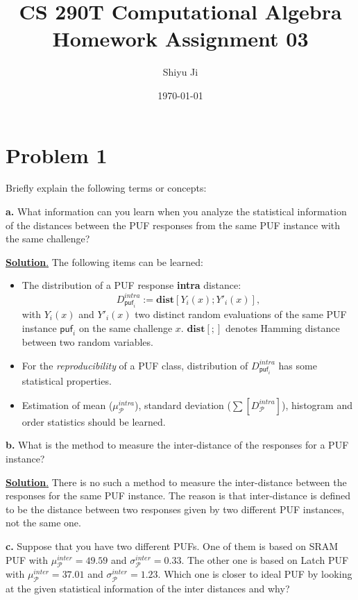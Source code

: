 \documentclass[12pt]{article}
\theoremstyle{plain}
\begin{document}
\title{CS 290T Computational Algebra Homework Assignment 03}
\author{Shiyu Ji}
\date{\today}
\maketitle

\newcommand{\m}[1]{\begin{bmatrix}#1\end{bmatrix}}
\newcommand{\rank}[1]{\operatorname{rank}(#1)}
\newcommand{\F}{\mathbb{F}}
\newcommand{\Sol}{\underline{\textbf{Solution}.} }

\section{Problem 1}
Briefly explain the following terms or concepts:

{\bf a.} What information can you learn when you analyze the statistical
information of the distances between the PUF responses from the
same PUF instance with the same challenge?

\newcommand{\p}{\mathcal{P}}
\newcommand{\puf}{\textsf{puf}}
\newcommand{\dist}{\textbf{dist}}
\Sol The following items can be learned:
\begin{itemize}
\item The distribution of a PUF response {\bf intra} distance:
$$D_{\puf_i}^{intra} := \dist[Y_i(x); Y'_i(x)],$$
with $Y_i(x)$ and $Y'_i(x)$ two distinct random evaluations of the same PUF instance $\puf_i$ on the same challenge $x$. $\dist[;]$ denotes Hamming distance between two random variables.
\item For the \emph{reproducibility} of a PUF class, distribution of $D_{\puf_i}^{intra}$ has some statistical properties.
\item Estimation of mean ($\mu_{\p}^{intra}$), standard deviation ($\sum[D_{\p}^{intra}]$), histogram and order statistics should be learned.
\end{itemize}

{\bf b.} What is the method to measure the inter-distance of the responses
for a PUF instance?

\Sol There is no such a method to measure the inter-distance between the responses for the same PUF instance. The reason is that inter-distance is defined to be the distance between two responses given by two different PUF instances, not the same one.


{\bf c.} Suppose that you have two different PUFs. One of them is based
on SRAM PUF with $\mu_{\p}^{inter} = 49.59$ and $\sigma_{\p}^{inter} = 0.33$. The other one is based on Latch PUF with $\mu_{\p}^{inter} = 37.01$ and $\sigma_{\p}^{inter} = 1.23$. Which one is closer to ideal PUF by looking at the given statistical
information of the inter distances and why?
\end{document}
